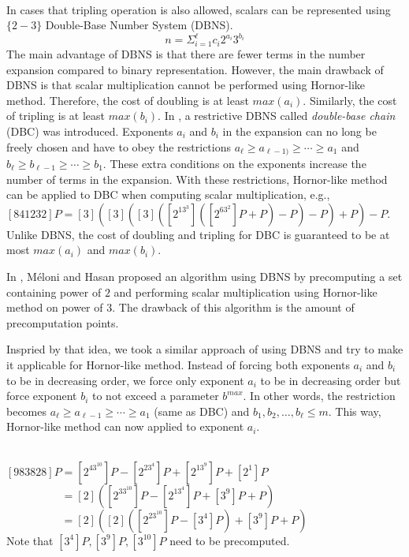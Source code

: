  \\
In cases that tripling operation is also allowed, scalars can be represented using $\{2-3\}$ Double-Base Number System (DBNS).
$$n = \Sigma^{\ell}_{i=1} c_i 2^{a_i}3^{b_i}$$
The main advantage of DBNS is that there are fewer terms in the number expansion compared to binary representation.
However, the main drawback of DBNS is that scalar multiplication cannot be performed using Hornor-like method.
Therefore, the cost of doubling is at least $max(a_i)$.  Similarly, the cost of tripling is at least $max(b_i)$.
In \cite{DIM05}, a restrictive DBNS called {\it{double-base chain}} (DBC) was introduced.
Exponents $a_i$ and $b_i$ in the expansion can no long be freely chosen and have to obey the restrictions
$a_\ell \ge a_{\ell-1)} \ge \cdots \ge a_1$ and $b_\ell \ge b_{\ell-1} \ge \cdots \ge b_1$.
These extra conditions on the exponents increase the number of terms in the expansion.
With these restrictions, Hornor-like method can be applied to DBC when computing scalar multiplication, e.g.,
$[841232]P = [3]([3]([3]([2^13^3]([2^63^2]P+P)-P)-P)+P)-P$.
Unlike DBNS, the cost of doubling and tripling for DBC is guaranteed to be at most $max(a_i)$ and $max(b_i)$.

In \cite{MH09}, M\'eloni and Hasan proposed an algorithm using DBNS by precomputing a set containing power of $2$ and
performing scalar multiplication using Hornor-like method on power of $3$.
The drawback of this algorithm is the amount of precomputation points.

Inspried by that idea, we took a similar approach of using DBNS and try to make it applicable for Hornor-like method.
Instead of forcing both exponents $a_i$ and $b_i$ to be in decreasing order,
we force only exponent $a_i$ to be in decreasing order but force exponent $b_i$ to not exceed a parameter $b^{max}$.
In other words, the restriction becomes
$a_\ell \ge a_{\ell-1} \ge \cdots \ge a_1$ (same as DBC) and $b_1,b_2,\dots,b_\ell \le m$.
This way, Hornor-like method can now applied to exponent $a_i$.

 \\
$[983828]P = [2^43^{10}]P - [2^23^4]P + [2^13^9]P + [2^1]P$ \\
$\phantom{[983828]P} = [2]([2^33^{10}]P - [2^13^4]P + [3^9]P + P)$ \\
$\phantom{[983828]P} = [2]([2]([2^23^{10}]P - [3^4]P) + [3^9]P + P)$ \\
Note that $[3^4]P, [3^9]P, [3^{10}]P$ need to be precomputed. \\

